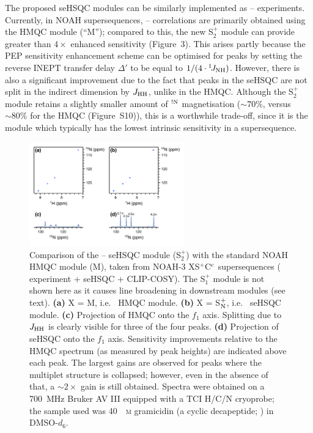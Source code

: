 \documentclass[final,twocolumn]{elsarticle}
\newcommand*{\noahCc}{C$\rm ^c$}
\newcommand*{\noahM}{M}
\newcommand*{\noahSp}{S$^+$}
\newcommand*{\noahSpa}{S$^+_1$}
\newcommand*{\noahSpb}{S$^+_2$}
\newcommand*{\noahSpn}{S$\rm ^+_N$}
\newcommand*{\noahX}{X}
\newcommand*{\carbon}{\ce{^{13}C}}
\newcommand*{\proton}{\ce{^{1}H}}
\newcommand*{\nitrogen}{\ce{^{15}N}}
\newcommand*{\onejnh}{{}^{1}\!J_{\ce{NH}}}
\newcommand*{\magnnot}[1]{\ce{^1H}$^{!#1}$}
\newcommand*{\jhh}{J_{\ce{HH}}}
\begin{document}
The proposed seHSQC modules can be similarly implemented as \proton{}--\nitrogen{} experiments.
Currently, in NOAH supersequences, \proton{}--\nitrogen{} correlations are primarily obtained using the HMQC module (``M'');\cite{Kupce2007MRC, Kupce2017ACIE} compared to this, the new \noahSpb{} module can provide greater than $4\times$ enhanced sensitivity (Figure~3).
This arises partly because the PEP sensitivity enhancement scheme can be optimised for  peaks by setting the reverse INEPT transfer delay $\Delta'$ to be equal to $1/(4 \cdot\onejnh)$.
However, there is also a significant improvement due to the fact that peaks in the \nitrogen{} seHSQC are not split in the indirect dimension by $\jhh$, unlike in the HMQC.
Although the \noahSpb{} module retains a slightly smaller amount of \magnnot{\ce{N}} magnetisation ($\sim 70\%$, versus $\sim 80\%$ for the HMQC (Figure~S10)), this is a worthwhile trade-off, since it is the \nitrogen{} module which typically has the lowest intrinsic sensitivity in a supersequence.

\begin{figure}[!ht]
    \centering
    \includegraphics[width=0.6\textwidth]{15n_spv2vsm.png}
    \caption{
        Comparison of the \proton{}--\nitrogen{} seHSQC module (\noahSpb{}) with the standard NOAH HMQC module (\noahM{}), taken from NOAH-3 \noahX{}\noahSp{}\noahCc{} supersequences (\nitrogen{} experiment + \carbon{} seHSQC + CLIP-COSY).
        The \noahSpa{} module is not shown here as it causes line broadening in downstream modules (see text).
        \textbf{(a)} X = \noahM{}, i.e.\ \nitrogen{} HMQC module.
        \textbf{(b)} X = \noahSpn{}, i.e.\ \nitrogen{} seHSQC module.
        \textbf{(c)} Projection of HMQC onto the $f_1$ axis.
        Splitting due to $\jhh$ is clearly visible for three of the four peaks.
        \textbf{(d)} Projection of seHSQC onto the $f_1$ axis.
        Sensitivity improvements relative to the HMQC spectrum (as measured by peak heights) are indicated above each peak.
        The largest gains are observed for peaks where the multiplet structure is collapsed; however, even in the absence of that, a $\sim 2\times$ gain is still obtained.
        Spectra were obtained on a \SI{700}{\MHz} Bruker AV III equipped with a TCI H/C/N cryoprobe; the sample used was \SI{40}{\milli\textsc{m}} gramicidin (a cyclic decapeptide; ) in DMSO-$d_6$.
    }
    \label{fig:15n_spv2vsm}
\end{figure}
\end{document}
